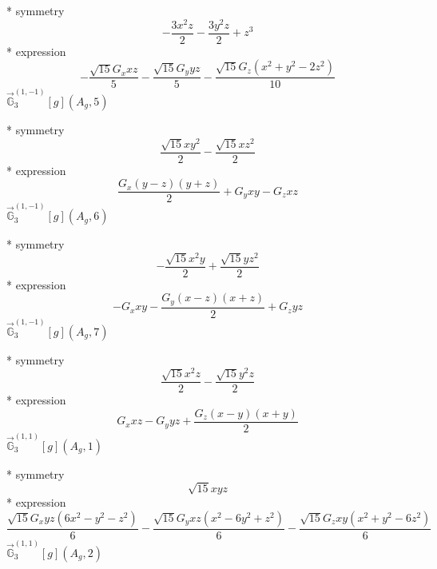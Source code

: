 \documentclass[fleqn,8pt]{jsarticle}
\begin{document}
\noindent\quad ** symmetry
\begin{dmath*}
- \frac{3 x^{2} z}{2} - \frac{3 y^{2} z}{2} + z^{3}
\end{dmath*}
\noindent\quad ** expression
\begin{dmath*}
- \frac{\sqrt{15} G_{x} x z}{5} - \frac{\sqrt{15} G_{y} y z}{5} - \frac{\sqrt{15} G_{z} \left(x^{2} + y^{2} - 2 z^{2}\right)}{10}
\end{dmath*}
\noindent\quad $\vec{\mathbb{G}}_{3}^{(1,-1)}[g](A_{g},5)$

\noindent\quad ** symmetry
\begin{dmath*}
\frac{\sqrt{15} x y^{2}}{2} - \frac{\sqrt{15} x z^{2}}{2}
\end{dmath*}
\noindent\quad ** expression
\begin{dmath*}
\frac{G_{x} \left(y - z\right) \left(y + z\right)}{2} + G_{y} x y - G_{z} x z
\end{dmath*}
\noindent\quad $\vec{\mathbb{G}}_{3}^{(1,-1)}[g](A_{g},6)$

\noindent\quad ** symmetry
\begin{dmath*}
- \frac{\sqrt{15} x^{2} y}{2} + \frac{\sqrt{15} y z^{2}}{2}
\end{dmath*}
\noindent\quad ** expression
\begin{dmath*}
- G_{x} x y - \frac{G_{y} \left(x - z\right) \left(x + z\right)}{2} + G_{z} y z
\end{dmath*}
\noindent\quad $\vec{\mathbb{G}}_{3}^{(1,-1)}[g](A_{g},7)$

\noindent\quad ** symmetry
\begin{dmath*}
\frac{\sqrt{15} x^{2} z}{2} - \frac{\sqrt{15} y^{2} z}{2}
\end{dmath*}
\noindent\quad ** expression
\begin{dmath*}
G_{x} x z - G_{y} y z + \frac{G_{z} \left(x - y\right) \left(x + y\right)}{2}
\end{dmath*}
\noindent\quad $\vec{\mathbb{G}}_{3}^{(1,1)}[g](A_{g},1)$

\noindent\quad ** symmetry
\begin{dmath*}
\sqrt{15} x y z
\end{dmath*}
\noindent\quad ** expression
\begin{dmath*}
\frac{\sqrt{15} G_{x} y z \left(6 x^{2} - y^{2} - z^{2}\right)}{6} - \frac{\sqrt{15} G_{y} x z \left(x^{2} - 6 y^{2} + z^{2}\right)}{6} - \frac{\sqrt{15} G_{z} x y \left(x^{2} + y^{2} - 6 z^{2}\right)}{6}
\end{dmath*}
\noindent\quad $\vec{\mathbb{G}}_{3}^{(1,1)}[g](A_{g},2)$
\end{document}

